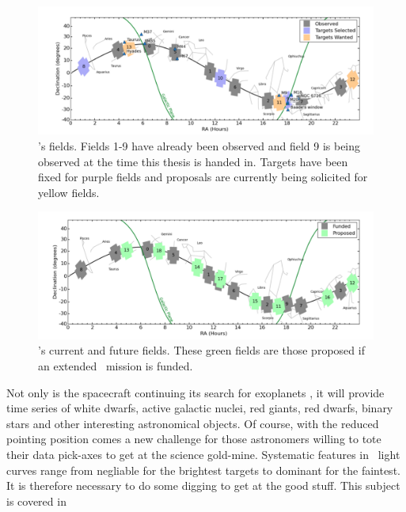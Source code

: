 \begin{figure}[p]
\begin{center}
\includegraphics[width=6in, clip=true]{figures/Current_K2_fields.pdf}
\caption{\ktwo's fields. Fields 1-9 have already been observed and field 9 is
being observed at the time this thesis is handed in. Targets have been fixed
for purple fields and proposals are currently being solicited for yellow
fields.}
\label{fig:current_fields}
\end{center}
\end{figure}

\begin{figure}[p]
\begin{center}
\includegraphics[width=6in, clip=true]{figures/Future_K2_fields.pdf}
\caption{\ktwo's current and future fields. These green fields are those
proposed if an extended \ktwo\ mission is funded.}
\label{fig:future_fields}
\end{center}
\end{figure}

Not only is the spacecraft continuing its search for exoplanets \citep[and has
already discovered many, \eg][]{Vanderburg2015, Crossfield2015,
Foreman-Mackey2015, Montet2015, Becker2015, Vanderburg2016}, it will
provide time series of white dwarfs, active galactic nuclei, red giants, red
dwarfs, binary stars and other interesting astronomical objects.
Of course, with the reduced pointing position comes a new challenge for
those astronomers willing to tote their data pick-axes to get at the science
gold-mine.
Systematic features in \ktwo\ light curves range from negliable for the
brightest targets to dominant for the faintest.
It is therefore necessary to do some digging to get at the good stuff.
This subject is covered in 

